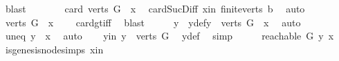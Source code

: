 \begin{isabellebody}
\ blast\isanewline
\ \ \isamarkupfalse%
\ \isamarkupfalse%
\ {\isachardoublequoteopen}{}\ {\isacharless}{\kern0pt}\ card\ {\isacharparenleft}{\kern0pt}{\isacharparenleft}{\kern0pt}verts\ G{\isacharparenright}{\kern0pt}\ {\isacharminus}{\kern0pt}\ {\isacharbraceleft}{\kern0pt}x{\isacharbraceright}{\kern0pt}{\isacharparenright}{\kern0pt}{\isachardoublequoteclose}\ \isamarkupfalse%
\ card{\isacharunderscore}{\kern0pt}Suc{\isacharunderscore}{\kern0pt}Diff{}\ x{\isacharunderscore}{\kern0pt}in\ finite{\isacharunderscore}{\kern0pt}verts\ b{}\ \isamarkupfalse%
\ auto\isanewline
\ \ \isamarkupfalse%
\ \isamarkupfalse%
\ {\isachardoublequoteopen}{\isacharparenleft}{\kern0pt}{\isacharparenleft}{\kern0pt}verts\ G{\isacharparenright}{\kern0pt}\ {\isacharminus}{\kern0pt}\ {\isacharbraceleft}{\kern0pt}x{\isacharbraceright}{\kern0pt}{\isacharparenright}{\kern0pt}\ {\isasymnoteq}\ {\isacharbraceleft}{\kern0pt}{\isacharbraceright}{\kern0pt}{\isachardoublequoteclose}\ \isamarkupfalse%
\ card{\isacharunderscore}{\kern0pt}gt{\isacharunderscore}{\kern0pt}{}{\isacharunderscore}{\kern0pt}iff\ \isamarkupfalse%
\ blast\isanewline
\ \ \isamarkupfalse%
\ \isamarkupfalse%
\ y\ \ y{\isacharunderscore}{\kern0pt}def{\isacharcolon}{\kern0pt}{\isachardoublequoteopen}y\ {\isasymin}\ {\isacharparenleft}{\kern0pt}verts\ G{\isacharparenright}{\kern0pt}\ {\isacharminus}{\kern0pt}\ {\isacharbraceleft}{\kern0pt}x{\isacharbraceright}{\kern0pt}{\isachardoublequoteclose}\ \isamarkupfalse%
\ auto\isanewline
\ \ \isamarkupfalse%
\ \isamarkupfalse%
\ uneq{\isacharcolon}{\kern0pt}\ {\isachardoublequoteopen}y\ {\isasymnoteq}\ x{\isachardoublequoteclose}\ \isamarkupfalse%
\ auto\isanewline
\ \ \isamarkupfalse%
\ y{\isacharunderscore}{\kern0pt}in{\isacharcolon}{\kern0pt}\ {\isachardoublequoteopen}y\ {\isasymin}\ {\isacharparenleft}{\kern0pt}verts\ G{\isacharparenright}{\kern0pt}{\isachardoublequoteclose}\ \isamarkupfalse%
\ y{\isacharunderscore}{\kern0pt}def\ \isamarkupfalse%
\ simp\isanewline
\ \ \isamarkupfalse%
\ \isamarkupfalse%
\ {\isachardoublequoteopen}reachable{}\ G\ y\ x{\isachardoublequoteclose}\ \isamarkupfalse%
\ is{\isacharunderscore}{\kern0pt}genesis{\isacharunderscore}{\kern0pt}node{\isachardot}{\kern0pt}simps\ x{\isacharunderscore}{\kern0pt}in\isanewline

\end{isabellebody}
